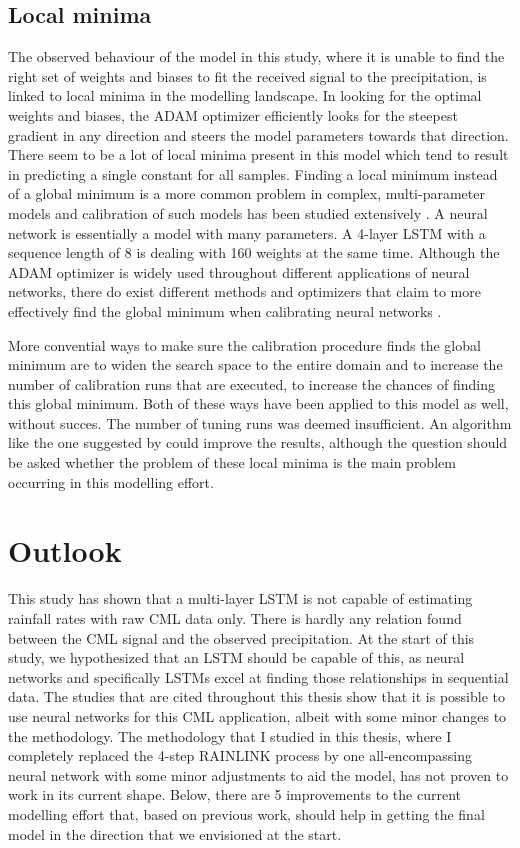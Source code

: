 \documentclass[twocolumn, 10pt, a4paper]{memoir}
\begin{document}
	\subsection{Local minima} \label{sec: local minima}
	The observed behaviour of the model in this study, where it is unable to find the right set of weights and biases to fit the received signal to the precipitation, is linked to local minima in the modelling landscape. In looking for the optimal weights and biases, the ADAM optimizer efficiently looks for the steepest gradient in any direction and steers the model parameters towards that direction. There seem to be a lot of local minima present in this model which tend to result in predicting a single constant for all samples. Finding a local minimum instead of a global minimum is a more common problem in complex, multi-parameter models and calibration of such models has been studied extensively \cite{Duan1992,Arsenault2014}. A neural network is essentially a model with many parameters. A 4-layer LSTM with a sequence length of 8 is dealing with 160 weights at the same time. Although the ADAM optimizer is widely used throughout different applications of neural networks, there do exist different methods and optimizers that claim to more effectively find the global minimum when calibrating neural networks \cite{Bianchini1994}. 
	
	More convential ways to make sure the calibration procedure finds the global minimum are to widen the search space to the entire domain and to increase the number of calibration runs that are executed, to increase the chances of finding this global minimum. Both of these ways have been applied to this model as well, without succes. The number of tuning runs was deemed insufficient. An algorithm like the one suggested by  could improve the results, although the question should be asked whether the problem of these local minima is the main problem occurring in this modelling effort. 
	
	\section{Outlook}
	This study has shown that a multi-layer LSTM is not capable of estimating rainfall rates with raw CML data only. There is hardly any relation found between the CML signal and the observed precipitation. At the start of this study, we hypothesized that an LSTM should be capable of this, as neural networks and specifically LSTMs excel at finding those relationships in sequential data. The studies that are cited throughout this thesis show that it is possible to use neural networks for this CML application, albeit with some minor changes to the methodology. The methodology that I studied in this thesis, where I completely replaced the 4-step RAINLINK process by one all-encompassing neural network with some minor adjustments to aid the model, has not proven to work in its current shape. Below, there are 5 improvements to the current modelling effort that, based on previous work, should help in getting the final model in the direction that we envisioned at the start. 
	
\end{document}
